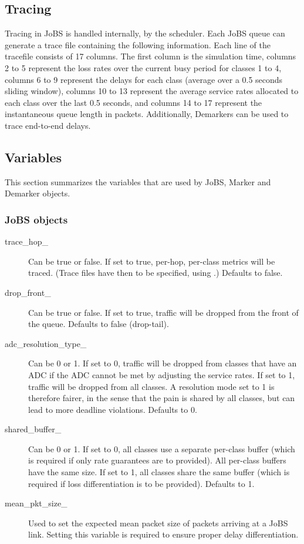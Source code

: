 \subsection{Tracing}
Tracing in JoBS is handled internally, by the scheduler. 
Each JoBS queue can generate a 
trace file containing the following information.  
Each line of the tracefile consists of 17 columns. The first column is the 
simulation time, columns 2 to 5 represent the loss rates over the current busy 
period for classes 1 to 4, columns 6 to 9 represent the delays for each class 
(average over a 0.5 seconds sliding window), columns 10 to 13 represent the 
average service rates allocated to each class over the last 0.5 seconds, and 
columns 14 to 17 represent the instantaneous queue length in packets. 
Additionally, Demarkers can be used to trace end-to-end delays.

\subsection{Variables}
This section summarizes the variables that are used by JoBS, Marker and Demarker objects.
\subsubsection{JoBS objects}
\begin{description}
\item[trace\_hop\_] Can be true or false. If set to true, per-hop, per-class metrics will be traced. (Trace files have then to be specified, using .) Defaults to false.
\item[drop\_front\_] Can be true or false. If set to true, traffic will be dropped from the front of the queue. Defaults to false (drop-tail).
\item[adc\_resolution\_type\_] Can be 0 or 1. 
If set to 0, traffic will be dropped from classes that have an ADC if the ADC 
cannot be met by adjusting the service rates. If set to 1, traffic will be 
dropped from all classes. A resolution mode set to 
1 is therefore fairer, in the sense that the pain is shared by all classes, 
but can lead to more deadline violations. Defaults to 0.
\item[shared\_buffer\_] Can be 0 or 1. If set to 0, all classes use a separate 
per-class 
buffer (which is required if only rate guarantees are to provided). All 
per-class buffers have the same size. 
If set to 
1, all classes share the same buffer (which is required if loss differentiation
is to be provided). Defaults to 1.
\item[mean\_pkt\_size\_] 
Used to set the expected mean packet size of packets arriving at a JoBS link. 
Setting this variable is required to ensure proper delay differentiation.
\end{description}
